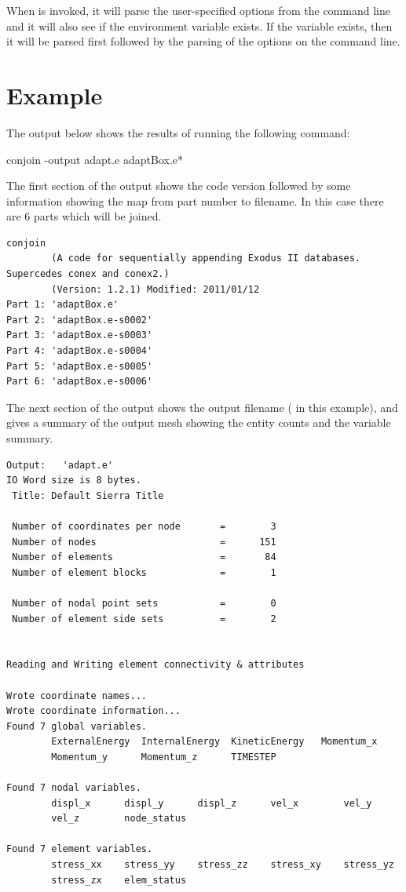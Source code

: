 When \conjoin{} is invoked, it will parse the user-specified options from
the command line and it will also see if the environment variable
 exists.  If the variable exists, then it will be
parsed first followed by the parsing of the options on the command line.

\section{Example}
The output below shows the results of running the following command:
\begin{syntax}
	conjoin -output adapt.e adaptBox.e*
\end{syntax}

The first section of the output shows the code version followed by some
information showing the map from part number to filename. In this case
there are 6 parts which will be joined.

\begin{verbatim}
conjoin
        (A code for sequentially appending Exodus II databases. Supercedes conex and conex2.)
        (Version: 1.2.1) Modified: 2011/01/12
Part 1: 'adaptBox.e'
Part 2: 'adaptBox.e-s0002'
Part 3: 'adaptBox.e-s0003'
Part 4: 'adaptBox.e-s0004'
Part 5: 'adaptBox.e-s0005'
Part 6: 'adaptBox.e-s0006'
\end{verbatim}
\sectionline
The next section of the output shows the output filename
( in this example), and gives a summary of the output
mesh showing the entity counts and the variable summary.
\begin{verbatim}
Output:   'adapt.e'
IO Word size is 8 bytes.
 Title: Default Sierra Title

 Number of coordinates per node       =        3
 Number of nodes                      =      151
 Number of elements                   =       84
 Number of element blocks             =        1

 Number of nodal point sets           =        0
 Number of element side sets          =        2


Reading and Writing element connectivity & attributes

Wrote coordinate names...
Wrote coordinate information...
Found 7 global variables.
        ExternalEnergy  InternalEnergy  KineticEnergy   Momentum_x      
        Momentum_y      Momentum_z      TIMESTEP        

Found 7 nodal variables.
        displ_x      displ_y      displ_z      vel_x        vel_y        
        vel_z        node_status  

Found 7 element variables.
        stress_xx    stress_yy    stress_zz    stress_xy    stress_yz    
        stress_zx    elem_status  
\end{verbatim}
\sectionline

